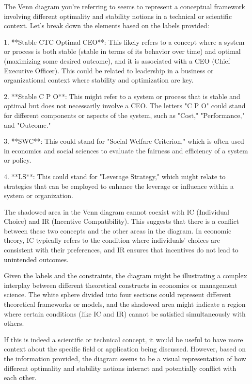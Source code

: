 The Venn diagram you're referring to seems to represent a conceptual framework involving different optimality and stability notions in a technical or scientific context. Let's break down the elements based on the labels provided:

1. **Stable CTC Optimal CEO**: This likely refers to a concept where a system or process is both stable (stable in terms of its behavior over time) and optimal (maximizing some desired outcome), and it is associated with a CEO (Chief Executive Officer). This could be related to leadership in a business or organizational context where stability and optimization are key.

2. **Stable C P O**: This might refer to a system or process that is stable and optimal but does not necessarily involve a CEO. The letters "C P O" could stand for different components or aspects of the system, such as "Cost," "Performance," and "Outcome."

3. **SWC**: This could stand for "Social Welfare Criterion," which is often used in economics and social sciences to evaluate the fairness and efficiency of a system or policy.

4. **LS**: This could stand for "Leverage Strategy," which might relate to strategies that can be employed to enhance the leverage or influence within a system or organization.

The shadowed area in the Venn diagram cannot coexist with IC (Individual Choice) and IR (Incentive Compatibility). This suggests that there is a conflict between these two concepts and the other areas in the diagram. In economic theory, IC typically refers to the condition where individuals' choices are consistent with their preferences, and IR ensures that incentives do not lead to unintended outcomes.

Given the labels and the constraints, the diagram might be illustrating a complex interplay between different theoretical constructs in economics or management science. The white sphere divided into four sections could represent different theoretical frameworks or models, and the shadowed area might indicate a region where certain conditions (like IC and IR) cannot be satisfied simultaneously with others.

If this is indeed a scientific or technical concept, it would be useful to have more context about the specific field or application being discussed. However, based on the information provided, the diagram seems to be a visual representation of how different optimality and stability notions interact and potentially conflict with each other.